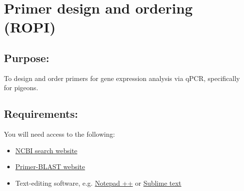 \documentclass[a4paper,12pt,twoside]{book}
\begin{document}
	\thispagestyle{fancy}%
\section*{Primer design and ordering (ROPI)}
 \subsection*{Purpose:}
To design and order primers for gene expression analysis via qPCR, specifically for pigeons.

\subsection*{Requirements:}
You will need access to the following:

\begin{itemize}
	\item \href{https://www.ncbi.nlm.nih.gov/ncbisearch/}{NCBI search website} 
	\item \href{https://blast.ncbi.nlm.nih.gov/Blast.cgi}{Primer-BLAST website} 
	\item Text-editing software, e.g.  \href{https://notepad-plus-plus.org/}{Notepad ++} or  \href{https://www.sublimetext.com/}{Sublime text} 
\end{itemize}
\end{document}
